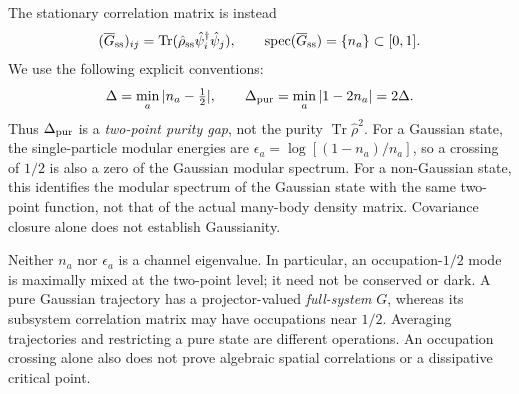 \documentclass[aps,prb,twocolumn,nofootinbib,superscriptaddress]{revtex4-2}
\newcommand{\Tr}{\operatorname{Tr}}
\begin{document}
The stationary correlation matrix is instead
\begin{equation}
 (\overline G_{\rm ss})_{ij}
 =\Tr(\hat\rho_{\rm ss}\hat\psi_i^\dagger\hat\psi_j),
 \qquad \operatorname{spec}(\overline G_{\rm ss})=\{n_a\}\subset[0,1].
\end{equation}
We use the following explicit conventions:
\begin{equation}
 \Delta=\min_a|n_a-\tfrac12|,
 \qquad \Delta_{\rm pur}=\min_a|1-2n_a|=2\Delta.
 \label{eq:purity}
\end{equation}
Thus $\Delta_{\rm pur}$ is a \emph{two-point purity gap}, not the purity
$\Tr\hat\rho^2$. For a Gaussian state, the single-particle modular
energies are $\epsilon_a=\log[(1-n_a)/n_a]$, so a crossing of $1/2$
is also a zero of the Gaussian modular spectrum. For a non-Gaussian state,
this identifies the modular spectrum of the Gaussian state with the same
two-point function, not that of the actual many-body density matrix.
Covariance closure alone does not establish Gaussianity.

Neither $n_a$ nor $\epsilon_a$ is a channel eigenvalue. In particular,
an occupation-$1/2$ mode is maximally mixed at the two-point level; it need
not be conserved or dark. A pure Gaussian trajectory has a projector-valued
\emph{full-system} $G$, whereas its subsystem correlation matrix may have
occupations near $1/2$. Averaging trajectories and restricting a pure state
are different operations. An occupation crossing alone also does not prove
algebraic spatial correlations or a dissipative critical point.
\end{document}
